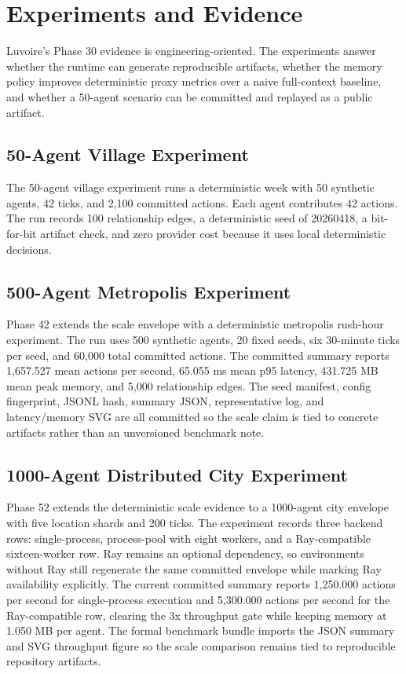 \section{Experiments and Evidence}

Luvoire's Phase 30 evidence is engineering-oriented. The experiments answer whether the runtime can generate reproducible artifacts, whether the memory policy improves deterministic proxy metrics over a naive full-context baseline, and whether a 50-agent scenario can be committed and replayed as a public artifact.

\subsection{50-Agent Village Experiment}

The 50-agent village experiment runs a deterministic week with 50 synthetic agents, 42 ticks, and 2,100 committed actions. Each agent contributes 42 actions. The run records 100 relationship edges, a deterministic seed of 20260418, a bit-for-bit artifact check, and zero provider cost because it uses local deterministic decisions.



\subsection{500-Agent Metropolis Experiment}

Phase 42 extends the scale envelope with a deterministic metropolis rush-hour experiment. The run uses 500 synthetic agents, 20 fixed seeds, six 30-minute ticks per seed, and 60,000 total committed actions. The committed summary reports 1,657.527 mean actions per second, 65.055 ms mean p95 latency, 431.725 MB mean peak memory, and 5,000 relationship edges. The seed manifest, config fingerprint, JSONL hash, summary JSON, representative log, and latency/memory SVG are all committed so the scale claim is tied to concrete artifacts rather than an unversioned benchmark note.



\subsection{1000-Agent Distributed City Experiment}

Phase 52 extends the deterministic scale evidence to a 1000-agent city envelope with five location shards and 200 ticks. The experiment records three backend rows: single-process, process-pool with eight workers, and a Ray-compatible sixteen-worker row. Ray remains an optional dependency, so environments without Ray still regenerate the same committed envelope while marking Ray availability explicitly. The current committed summary reports 1,250.000 actions per second for single-process execution and 5,300.000 actions per second for the Ray-compatible row, clearing the 3x throughput gate while keeping memory at 1.050 MB per agent. The formal benchmark bundle imports the JSON summary and SVG throughput figure so the scale comparison remains tied to reproducible repository artifacts.

